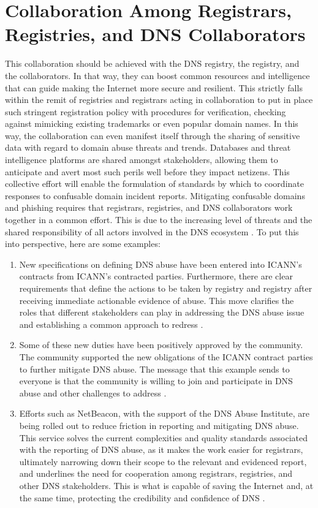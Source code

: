 \section{Collaboration Among Registrars, Registries, and DNS Collaborators}

This collaboration should be achieved with the DNS registry, the registry, and the collaborators. In that way, they can boost common resources and intelligence that can guide making the Internet more secure and resilient. This strictly falls within the remit of registries and registrars acting in collaboration to put in place such stringent registration policy with procedures for verification, checking against mimicking existing trademarks or even popular domain names. In this way, the collaboration can even manifest itself through the sharing of sensitive data with regard to domain abuse threats and trends. Databases and threat intelligence platforms are shared amongst stakeholders, allowing them to anticipate and avert most such perils well before they impact netizens. This collective effort will enable the formulation of standards by which to coordinate responses to confusable domain incident reports. Mitigating confusable domains and phishing requires that registrars, registries, and DNS collaborators work together in a common effort. This is due to the increasing level of threats and the shared responsibility of all actors involved in the DNS ecosystem \cite{Catania2022}. To put this into perspective, here are some examples: 


\begin{enumerate}
  \item New specifications on defining DNS abuse have been entered into ICANN’s contracts from ICANN’s contracted parties. Furthermore, there are clear requirements that define the actions to be taken by registry and registry after receiving immediate actionable evidence of abuse. This move clarifies the roles that different stakeholders can play in addressing the DNS abuse issue and establishing a common approach to redress \cite{Weinstein2023}.
  \item Some of these new duties have been positively approved by the community. The community supported the new obligations of the ICANN contract parties to further mitigate DNS abuse. The message that this example sends to everyone is that the community is willing to join and participate in DNS abuse and other challenges to address \cite{ICANN2023}.
  \item  Efforts such as NetBeacon, with the support of the DNS Abuse Institute, are being rolled out to reduce friction in reporting and mitigating DNS abuse. This service solves the current complexities and quality standards associated with the reporting of DNS abuse, as it makes the work easier for registrars, ultimately narrowing down their scope to the relevant and evidenced report, and underlines the need for cooperation among registrars, registries, and other DNS stakeholders. This is what is capable of saving the Internet and, at the same time, protecting the credibility and confidence of DNS \cite{NetBeacon}.
  
\end{enumerate}

